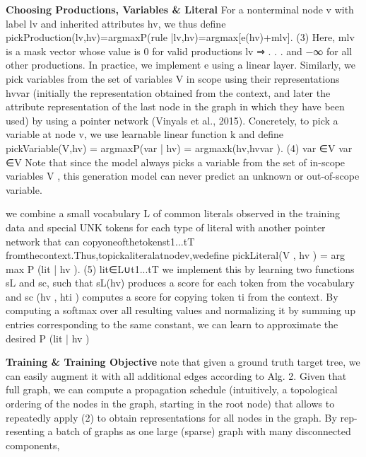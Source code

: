 \documentclass{article}
\begin{document}
\textbf{Choosing Productions, Variables & Literal} For a nonterminal node v with label lv and inherited attributes hv, we thus define
pickProduction(lv,hv)=argmaxP(rule |lv,hv)=argmax[e(hv)+mlv]. (3) Here, mlv is a mask vector whose value is 0 for valid productions lv ⇒ . . . and −∞ for all other
productions. In practice, we implement e using a linear layer.
Similarly, we pick variables from the set of variables V in scope using their representations hvvar (initially the representation obtained from the context, and later the attribute representation of the last node in the graph in which they have been used) by using a pointer network (Vinyals et al., 2015). Concretely, to pick a variable at node v, we use learnable linear function k and define
pickVariable(V,hv) = argmaxP(var | hv) = argmaxk(hv,hvvar ). (4) var ∈V var ∈V
Note that since the model always picks a variable from the set of in-scope variables V , this generation model can never predict an unknown or out-of-scope variable.

we combine a small vocabulary L of common literals observed in the training data and special UNK tokens for each type of literal with another pointer network that can copyoneofthetokenst1...tT fromthecontext.Thus,topickaliteralatnodev,wedefine
pickLiteral(V , hv ) = arg max P (lit | hv ). (5) lit∈L∪{t1...tT }
we implement this by learning two functions sL and sc, such that sL(hv) produces a score for each token from the vocabulary and sc (hv , hti ) computes a score for copying token ti from the context. By computing a softmax over all resulting values and normalizing it by summing up entries corresponding to the same constant, we can learn to approximate the desired P (lit | hv )

\textbf{Training & Training Objective} note that given a ground truth target tree, we can easily augment it with all additional edges according to Alg. 2. Given that full graph, we can compute a propagation schedule (intuitively, a topological ordering of the nodes in the graph, starting in the root node) that allows to repeatedly apply (2) to obtain representations for all nodes in the graph. By rep- resenting a batch of graphs as one large (sparse) graph with many disconnected components,
\end{document}
